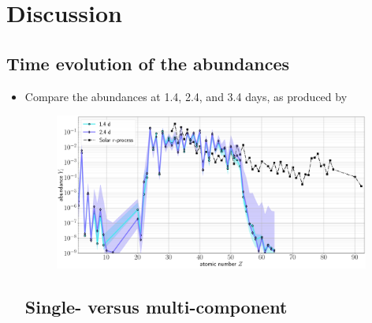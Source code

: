 \documentclass[twocolumn, twocolappendix]{aastex63}
\begin{document}

\section{Discussion}\label{sec:disco}


\subsection{Time evolution of the abundances}

\begin{itemize}

    \item Compare the abundances at 1.4, 2.4, and 3.4 days, as produced by 


\begin{figure}[!ht]
    \includegraphics[width=0.98\textwidth]{figs/compare_abunds_220808_014638-221022_084052_posterior-50samples.png}
    \label{fig:abunds_time_evolution}
\end{figure}



\subsection{Single- versus multi-component}


\end{itemize}
\end{document}

